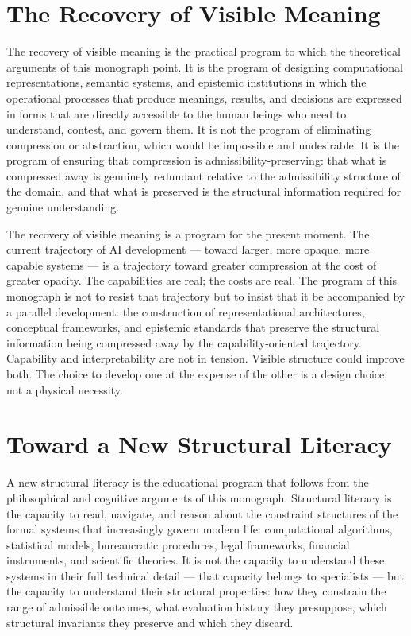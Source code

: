 \documentclass[12pt,openany]{book}
\theoremstyle{plain}
\theoremstyle{definition}
\theoremstyle{remark}
\begin{document}
\section*{The Recovery of Visible Meaning}

The recovery of visible meaning is the practical program to which the theoretical arguments of this monograph point. It is the program of designing computational representations, semantic systems, and epistemic institutions in which the operational processes that produce meanings, results, and decisions are expressed in forms that are directly accessible to the human beings who need to understand, contest, and govern them. It is not the program of eliminating compression or abstraction, which would be impossible and undesirable. It is the program of ensuring that compression is admissibility-preserving: that what is compressed away is genuinely redundant relative to the admissibility structure of the domain, and that what is preserved is the structural information required for genuine understanding.

The recovery of visible meaning is a program for the present moment. The current trajectory of AI development — toward larger, more opaque, more capable systems — is a trajectory toward greater compression at the cost of greater opacity. The capabilities are real; the costs are real. The program of this monograph is not to resist that trajectory but to insist that it be accompanied by a parallel development: the construction of representational architectures, conceptual frameworks, and epistemic standards that preserve the structural information being compressed away by the capability-oriented trajectory. Capability and interpretability are not in tension. Visible structure could improve both. The choice to develop one at the expense of the other is a design choice, not a physical necessity.

\section*{Toward a New Structural Literacy}

A new structural literacy is the educational program that follows from the philosophical and cognitive arguments of this monograph. Structural literacy is the capacity to read, navigate, and reason about the constraint structures of the formal systems that increasingly govern modern life: computational algorithms, statistical models, bureaucratic procedures, legal frameworks, financial instruments, and scientific theories. It is not the capacity to understand these systems in their full technical detail — that capacity belongs to specialists — but the capacity to understand their structural properties: how they constrain the range of admissible outcomes, what evaluation history they presuppose, which structural invariants they preserve and which they discard.
\end{document}
